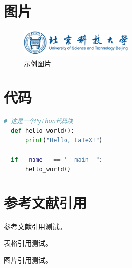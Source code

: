 \section{图片}

\begin{figure}[h]
  \centering
  \includegraphics[width=0.5\textwidth]{imgs/logo.png}
  \caption{示例图片}
  \label{fig:example}
\end{figure}

\section{代码}

\begin{lstlisting}[language=Python]
  # 这是一个Python代码块
  def hello_world():
      print("Hello, LaTeX!")
  
  if __name__ == "__main__":
      hello_world()
\end{lstlisting}

\section{参考文献引用}

参考文献引用测试\cite{xu2025, Wangyan2024, wu2023enhance}。

表格引用测试。

图片引用测试。